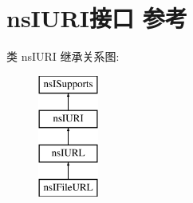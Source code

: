 \hypertarget{interfacens_i_u_r_i}{}\section{ns\+I\+U\+R\+I接口 参考}
\label{interfacens_i_u_r_i}
类 ns\+I\+U\+RI 继承关系图\+:\begin{figure}[H]
\begin{center}
\leavevmode
\includegraphics[height=4.000000cm]{interfacens_i_u_r_i}
\end{center}
\end{figure}
